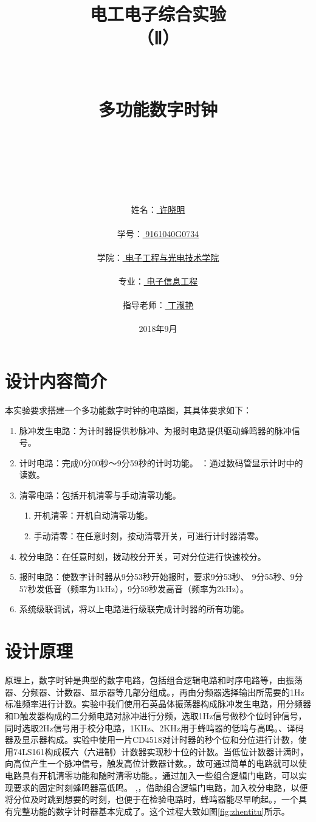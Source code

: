 \documentclass[12pt]{article}
\title{\songti\zihao{1}电工电子综合实验\\（Ⅱ）\\\ \\\ \\  \heiti\zihao{2}多功能数字时钟\\ \ \\\  \\\ }
\author{\heiti\zihao{3}姓名：\underline{      许晓明      }\\ \\\heiti\zihao{3}学号：\underline{ 9161040G0734 }\\ \\\heiti\zihao{3}学院：\underline{ 电子工程与光电技术学院 }\\ \\\heiti\zihao{3}专业：\underline{  电子信息工程 }\\ \\\heiti\zihao{3}指导老师：\underline{ 丁淑艳 }\\ \\\heiti\zihao{3}2018年9月}
\date{}
\begin{document}

\renewcommand{\contentsname}{\centering 目录}
\renewcommand{\tablename}{表}
\renewcommand{\figurename}{图}
\renewcommand\refname{参考文献}
\renewcommand\appendix{\setcounter{secnumdepth}{0}}
\renewcommand\abstractname{摘要}


\maketitle
\newpage
\tableofcontents

\newpage
\section{设计内容简介}
本实验要求搭建一个多功能数字时钟的电路图，其具体要求如下：
\begin{enumerate}
\item 脉冲发生电路：为计时器提供秒脉冲、为报时电路提供驱动蜂鸣器的脉冲信号。
\item 计时电路：完成0分00秒～9分59秒的计时功能。
：通过数码管显示计时中的读数。
\item 清零电路：包括开机清零与手动清零功能。
\begin{enumerate}
\item 开机清零：开机自动清零功能。
\item 手动清零：在任意时刻，按动清零开关，可进行计时器清零。
\end{enumerate}
\item 校分电路：在任意时刻，拨动校分开关，可对分位进行快速校分。
\item 报时电路：使数字计时器从9分53秒开始报时，要求9分53秒、 9分55秒、9分57秒发低音（频率为1kHz），9分59秒发高音（频率为2kHz）。
\item 系统级联调试，将以上电路进行级联完成计时器的所有功能。
\end{enumerate}






\section{设计原理}
原理上，数字时钟是典型的数字电路，包括组合逻辑电路和时序电路等，由振荡器、分频器、计数器、显示器等几部分组成。，再由分频器选择输出所需要的1Hz标准频率进行计数。实验中我们使用石英晶体振荡器构成脉冲发生电路，用分频器和D触发器构成的二分频电路对脉冲进行分频，选取1Hz信号做秒个位时钟信号，同时选取2Hz信号用于校分电路，1KHz、2KHz用于蜂鸣器的低鸣与高鸣。、译码器及显示器构成。实验中使用一片CD4518对计时器的秒个位和分位进行计数，使用74LS161构成模六（六进制）计数器实现秒十位的计数。当低位计数器计满时，向高位产生一个脉冲信号，触发高位计数器计数。，故可通过简单的电路就可以使电路具有开机清零功能和随时清零功能。，通过加入一些组合逻辑门电路，可以实现要求的固定时刻蜂鸣器高低鸣。
,，借助组合逻辑门电路，加入校分电路，以便将分位及时跳到想要的时刻，也便于在检验电路时，蜂鸣器能尽早响起。，一个具有完整功能的数字计时器基本完成了。这个过程大致如图\ref{fig:zhentitu}所示。
\end{document}
